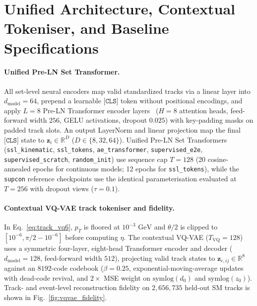 \documentclass{article}
\begin{document}



\clearpage
\appendix

\section{Unified Architecture, Contextual Tokeniser, and Baseline Specifications}
\label{app:arch}

\paragraph{Unified Pre-LN Set Transformer.}
All set-level neural encoders map valid standardized tracks via a linear layer into $d_{\text{model}} = 64$, prepend a learnable $\texttt{[CLS]}$ token without positional encodings, and apply $L = 8$ Pre-LN Transformer encoder layers~\cite{PreLNTransformer} ($H = 8$ attention heads, feed-forward width $256$, GELU activations, dropout $0.025$) with key-padding masks on padded track slots. An output LayerNorm and linear projection map the final $\texttt{[CLS]}$ state to $\mathbf{z}_i \in \mathbb{R}^D$ ($D \in \{8, 32, 64\}$). Unified Pre-LN Set Transformers (\texttt{ssl\_kinematic}, \texttt{ssl\_tokens}, \texttt{ae\_transformer}, \texttt{supervised\_e2e}, \texttt{supervised\_scratch}, \texttt{random\_init}) use sequence cap $T = 128$ (20 cosine-annealed epochs for continuous models; 12 epochs for \texttt{ssl\_tokens}), while the \texttt{supcon} reference checkpoints use the identical parameterisation evaluated at $T = 256$ with dropout views ($\tau = 0.1$).

\paragraph{Contextual VQ-VAE track tokeniser and fidelity.}
In Eq.~\eqref{eq:track_vq6}, $p_T$ is floored at $10^{-3}\text{ GeV}$ and $\theta/2$ is clipped to $[10^{-6}, \pi/2 - 10^{-6}]$ before computing $\eta$. The contextual VQ-VAE ($T_{\text{VQ}} = 128$) uses a symmetric four-layer, eight-head Transformer encoder and decoder ($d_{\text{model}} = 128$, feed-forward width $512$), projecting valid track states to $\mathbf{z}_{e,ij} \in \mathbb{R}^8$ against an $8192$-code codebook ($\beta = 0.25$, exponential-moving-average updates with dead-code revival, and $2\times$ MSE weight on $\text{symlog}(d_0)$ and $\text{symlog}(z_0)$). Track- and event-level reconstruction fidelity on $2,656,735$ held-out SM tracks is shown in Fig.~\ref{fig:vqvae_fidelity}.
\end{document}
